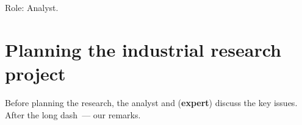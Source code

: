 \documentclass[12pt]{article}
\date{}
\begin{document}
\maketitle

Role: Analyst.


\section{Planning the industrial research project}
Before planning the research, the analyst and (\textbf{expert}) discuss the key issues. After the long dash~--- our remarks.
\end{document}
